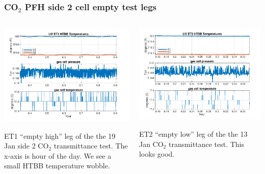 \documentclass[10pt]{beamer}
\begin{document}
\begin{frame}
\frametitle{CO$_2$ PFH side 2 cell empty test legs}
\begin{columns}[t]
\begin{column}{0.5\textwidth}
  \begin{centering}
  \includegraphics[width=\textwidth]{harvest_01-19/01-19_LW_ET1.png}
  \end{centering}\vspace{3mm}

  ET1 ``empty high'' leg of the the 19 Jan side 2 CO$_2$
  transmittance test.  The x-axis is hour of the day.  We see a
  small HTBB temperature wobble.

\end{column}
\begin{column}{0.5\textwidth}  
  \begin{centering}
  \includegraphics[width=\textwidth]{harvest_01-19/01-19_LW_ET2.png}
  \end{centering}\vspace{3mm}

  ET2 ``empty low'' leg of the the 13 Jan CO$_2$ transmittance test.
  This looks good.

\end{column}
\end{columns}
\end{frame}
\end{document}
